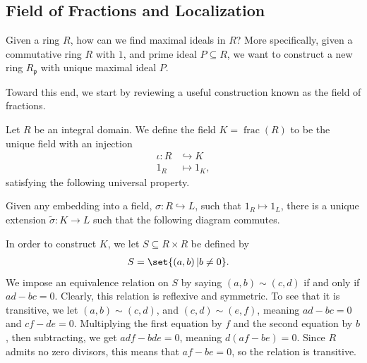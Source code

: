 \documentclass[10pt]{mypackage}
\begin{document}
\subsection{Field of Fractions and Localization}%
Given a ring $R$, how can we find maximal ideals in $R$? More specifically, given a commutative ring $R$ with $1$, and prime ideal $ P\subseteq R $, we want to construct a new ring $R_{\mathfrak{p}}$ with unique maximal ideal $P$.%

Toward this end, we start by reviewing a useful construction known as the field of fractions.
\begin{definition}
  Let $R$ be an integral domain. We define the field $K = \operatorname{frac}\left( R \right)$ to be the unique field with an injection
  \begin{align*}
    \iota\colon R&\hookrightarrow K\\
    1_{R} &\mapsto 1_{K},
  \end{align*}
  satisfying the following universal property.%

  Given any embedding into a field, $\sigma\colon R\hookrightarrow L$, such that $1_{R}\mapsto 1_{L}$, there is a unique extension $ \widetilde{\sigma}\colon K\rightarrow L $ such that the following diagram commutes.
  \begin{center}
  \end{center}
\end{definition}
In order to construct $K$, we let $S\subseteq R\times R$ be defined by
\begin{align*}
  S &= \set{\left( a,b \right) | b\neq 0}.
\end{align*}
We impose an equivalence relation on $S$ by saying $\left( a,b \right)\sim \left( c,d \right)$ if and only if $ ad - bc = 0 $. Clearly, this relation is reflexive and symmetric. To see that it is transitive, we let $\left( a,b \right)\sim \left( c,d \right)$, and $ \left( c,d \right)\sim \left( e,f \right) $, meaning $ad-bc=  0$ and $cf-de = 0$. Multiplying the first equation by $f$ and the second equation by $b$, then subtracting, we get $ adf - bde = 0 $, meaning $d\left( af-be  \right)= 0$. Since $R$ admits no zero divisors, this means that $ af-be = 0 $, so the relation is transitive.%
\end{document}
